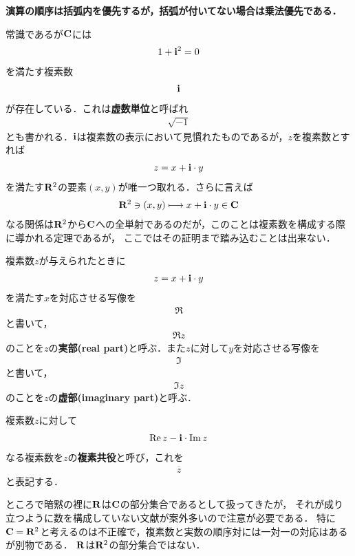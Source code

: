 	{\bf 演算の順序は括弧内を優先するが，括弧が付いてない場合は乗法優先である．}
	
	常識であるが$\mathbf{C}$には
	\begin{align}
		1 + \mathbf{i}^2 = 0
	\end{align}
	を満たす複素数
	\begin{align}
		\mathbf{i}
	\end{align}
	が存在している．これは{\bf 虚数単位}と呼ばれ
	\begin{align}
		\sqrt{-1}
	\end{align}
	とも書かれる．$\mathbf{i}$は複素数の表示において見慣れたものであるが，$z$を複素数とすれば
	\begin{align}
		z = x + \mathbf{i} \cdot y
	\end{align}
	を満たす$\mathbf{R}^2$の要素$(x,y)$が唯一つ取れる．さらに言えば
	\begin{align}
		\mathbf{R}^2 \ni (x,y) \longmapsto x + \mathbf{i} \cdot y \in \mathbf{C}
	\end{align}
	なる関係は$\mathbf{R}^2$から$\mathbf{C}$への全単射であるのだが，このことは複素数を構成する際に導かれる定理であるが，
	ここではその証明まで踏み込むことは出来ない．
	
	複素数$z$が与えられたときに
	\begin{align}
		z = x + \mathbf{i} \cdot y
	\end{align}
	を満たす$x$を対応させる写像を
	\begin{align}
		\Re
	\end{align}
	と書いて，
	\begin{align}
		\Re{z}
	\end{align}
	のことを$z$の{\bf 実部}{\bf (real part)}と呼ぶ．また$z$に対して$y$を対応させる写像を
	\begin{align}
		\Im
	\end{align}
	と書いて，
	\begin{align}
		\Im{z}
	\end{align}
	のことを$z$の{\bf 虚部}{\bf (imaginary part)}と呼ぶ．
	
	複素数$z$に対して
	\begin{align}
		\operatorname{Re} z - \mathbf{i} \cdot \operatorname{Im} z
	\end{align}
	なる複素数を$z$の{\bf 複素共役}と呼び，これを
	\begin{align}
		\overline{z}
	\end{align}
	と表記する．
	
	ところで暗黙の裡に$\mathbf{R}$は$\mathbf{C}$の部分集合であるとして扱ってきたが，
	それが成り立つように数を構成していない文献が案外多いので注意が必要である．
	特に$\mathbf{C} = \mathbf{R}^2$と考えるのは不正確で，複素数と実数の順序対には一対一の対応はあるが別物である．
	$\mathbf{R}$は$\mathbf{R}^2$の部分集合ではない．
	
